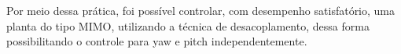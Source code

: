 Por meio dessa prática, foi possível controlar, com desempenho satisfatório, uma planta do tipo MIMO, utilizando a técnica de desacoplamento, dessa forma possibilitando o controle para yaw e pitch independentemente. 